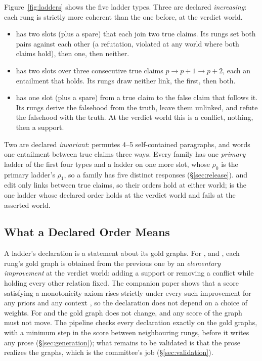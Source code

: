 \documentclass[11pt]{article}
\begin{document}
Figure~\ref{fig:ladders} shows the five ladder types. Three are declared \emph{increasing}: each
rung is strictly more coherent than the one before, at the verdict world.
\begin{itemize}[leftmargin=1.2em,itemsep=1pt,topsep=2pt]
\item {} has two slots (plus a spare) that each join two true claims. Its rungs set
  both pairs against each other (a refutation, violated at any world where both claims hold), then
  one, then neither.
\item {} has two slots over three consecutive true claims $p\to p{+}1\to p{+}2$, each an
  entailment that holds. Its rungs draw neither link, the first, then both.
\item {} has one slot (plus a spare) from a true claim to the false claim that follows it.
  Its rungs derive the falsehood from the truth, leave them unlinked, and refute the falsehood
  with the truth. At the verdict world this is a conflict, nothing, then a support.
\end{itemize}
Two are declared \emph{invariant}:  permutes 4--5 self-contained paragraphs, and
 words one entailment between true claims three ways. Every family has one
\emph{primary} ladder of the first four types and a  ladder on one more slot, whose
$\rho_0$ is the primary ladder's $\rho_1$, so a family has five distinct responses
(\S\ref{sec:release}).
 and  edit only links between true claims, so their orders hold at either
world;  is the one ladder whose declared order holds at the verdict world and fails at
the asserted world.

\subsection{What a Declared Order Means}
\label{sec:declared}

A ladder's declaration is a statement about its gold graphs. For ,  and
, each rung's gold graph is obtained from the previous one by an \emph{elementary
improvement} at the verdict world: adding a support or removing a conflict while holding every
other relation fixed. The companion paper shows that a score satisfying a monotonicity axiom rises
strictly under every such improvement for any priors and any context \citep{anoncoherence}, so
the declaration does not depend on a choice of weights. For  and  the gold
graph does not change, and any score of the graph must not move. The pipeline checks every
declaration exactly on the gold graphs, with a minimum step in the score between neighbouring
rungs, before it writes any prose (\S\ref{sec:generation}); what remains to be validated is that
the prose realizes the graphs, which is the committee's job (\S\ref{sec:validation}).
\end{document}
